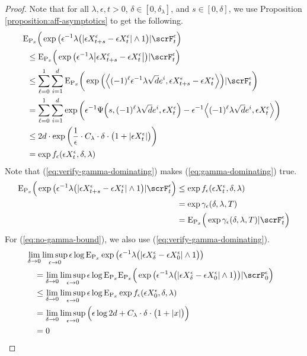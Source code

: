 \begin{proof}
  Note that for all $\lambda, \epsilon, t > 0$, $\delta \in [0,\delta_\lambda]$, and $s \in [0,\delta]$, we use Proposition \ref{proposition:aff-asymptotics} to get the following.
  \begin{align}
    \notag
    &\hspace{-0.5em}\Exp_{\Prb_\stateVar}\Big(
      \exp\big( \epsilon^{-1} \lambda \big( |\Xe_{t+s}-\Xe_t| \wedge 1 \big) 
      | \scrF^\epsilon_t \Big)  \tag*{} \\
    \notag
    &\leq \Exp_{\Prb_\stateVar}\Big(
      \exp\big( \epsilon^{-1} \lambda \big| \Xe_{t+s}-\Xe_t \big|  \big)
      | \scrF^\epsilon_t \Big) \\
    \notag
    &\leq \sum_{\ell=0}^1 \sum_{i=1}^d \Exp_{\Prb_\stateVar}\bigg(
      \exp\Big( \Bprj{(-1)^\ell\epsilon^{-1}\lambda\sqrt d  \basisVec^i}{\Xe_{t+s}-\Xe_t} \Big)
      | \scrF^\epsilon_t \bigg) \\
    \notag
    &= \sum_{\ell=0}^1 \sum_{i=1}^d \exp\bigg( 
      \epsilon^{-1}\aff\Big(s, (-1)^\ell\lambda\sqrt d \basisVec^i, \Xe_t \Big) 
      - \epsilon^{-1}\Bprj{(-1)^\ell\lambda\sqrt d \basisVec^i}{\Xe_t} \bigg) \\
    \notag
    &\leq 2d \cdot \exp\bigg( \frac1\epsilon \cdot C_\lambda \cdot \delta \cdot \big( 1 + |\Xe_t| \big) \bigg) \\
    &= \exp f_\epsilon(\Xe_t, \delta, \lambda)
    \label{eq:verify-gamma-dominating}
  \end{align}
  Note that (\ref{eq:verify-gamma-dominating}) makes (\ref{eq:gamma-dominating}) true.
  \begin{align*}
    \Exp_{\Prb_\stateVar}\Big(
      \exp\big( \epsilon^{-1} \lambda \big( |\Xe_{t+s}-\Xe_t| \wedge 1 \big) 
      | \scrF^\epsilon_t \Big)
    &\leq \exp f_\epsilon(\Xe_t, \delta, \lambda) \\
    &= \exp \gamma_\epsilon(\delta, \lambda,T) \\
    &= \Exp_{\Prb_\stateVar}\Big( \exp\gamma_\epsilon(\delta,\lambda,T) | \scrF^\epsilon_t \Big)
  \end{align*}
  For (\ref{eq:no-gamma-bound}), we also use (\ref{eq:verify-gamma-dominating}).
  \begin{align*}
    &\hspace{-1em}\lim_{\delta\rightarrow0} \limsup_{\epsilon\rightarrow0} 
      \epsilon\log\Exp_{\Prb_\stateVar}\exp\big( 
        \epsilon^{-1}\lambda \big(|\Xe_\delta - \Xe_0| \wedge 1\big) 
      \big)  \tag*{} \\
    &=\lim_{\delta\rightarrow0} \limsup_{\epsilon\rightarrow0} 
      \epsilon\log\Exp_{\Prb_\stateVar}
      \Exp_{\Prb_\stateVar}\Big(
      \exp\big(\epsilon^{-1}\lambda \big(|\Xe_\delta - \Xe_0| \wedge 1\big) \big)
      |\scrF^\epsilon_0 \Big) \\
    &\leq \lim_{\delta\rightarrow0}\limsup_{\epsilon\rightarrow0} \epsilon\log\Exp_{\Prb_\stateVar} \exp f_\epsilon(\Xe_0, \delta, \lambda) \\
    &= \lim_{\delta\rightarrow0}\limsup_{\epsilon\rightarrow0} \Big( \epsilon\log 2d + C_\lambda \cdot \delta \cdot \big( 1 + |\stateVar| \big) \Big) \\
    &= 0
  \end{align*}


\end{proof}
